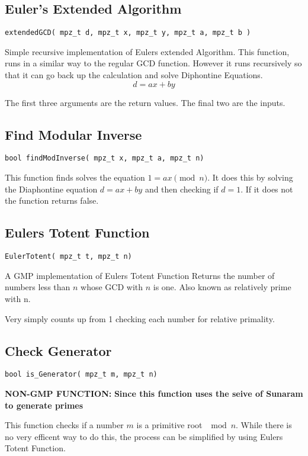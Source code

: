 \subsection{Euler's Extended Algorithm}
\begin{verbatim}
extendedGCD( mpz_t d, mpz_t x, mpz_t y, mpz_t a, mpz_t b )
\end{verbatim}
Simple recursive implementation of Eulers extended Algorithm.
This function, runs in a similar way to the regular GCD function. 
However it runs recursively so that it can go back up the calculation and solve Diphontine Equations.
$$d = ax + by$$

The first three arguments are the return values. The final two are the inputs.


\subsection{Find Modular Inverse}
\begin{verbatim}
bool findModInverse( mpz_t x, mpz_t a, mpz_t n)
\end{verbatim}
This function finds solves the equation $1 = ax \pmod n$. 
It does this  by solving the Diaphontine equation $d = ax + by$ and then checking if $d = 1$. 
If it does not the function returns false.

\subsection{Eulers Totent Function}
\begin{verbatim}
EulerTotent( mpz_t t, mpz_t n)
\end{verbatim}

A GMP implementation of Eulers Totent Function
Returns the number of numbers less than $n$ whose GCD with $n$ is one. 
Also known as relatively prime with n.

Very simply counts up from 1 checking each number for relative primality.


\subsection{Check Generator}
\begin{verbatim}
bool is_Generator( mpz_t m, mpz_t n)
\end{verbatim}
\textbf{ NON-GMP FUNCTION:}
\textbf{Since this function uses the seive of Sunaram to generate primes } 

This function checks if a number $m$ is a primitive root $\mod n$.
While there is no very efficent way to do this, the process can be simplified by using Eulers Totent Function.

